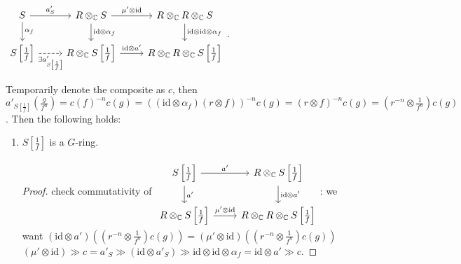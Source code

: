 \documentclass{article}
\theoremstyle{definition}
\newcommand{\tensorC}[2]{#1\otimes_\mathbb C #2}
\newcommand{\tensor}[2]{#1\otimes#2}
\newcommand{\id}{\mathrm{id}}
\begin{document}
$\begin{tikzcd}
  S \arrow[r, "a'_S"]\arrow[d, "\alpha_f"]& \tensorC R S\arrow[d, "\tensor\id{\alpha_f}"] \arrow[r, "\tensor{\mu'}{\id}"]& \tensorC{\tensorC R R} S\arrow[d, "\tensor{\tensor\id\id}{\alpha_f}"]\\
  {S\left[\frac1f\right]}\arrow[r, dashed, "\exists a'_{S\left[\frac1f\right]}"', description] & \tensorC R{S\left[\frac1f\right]} \arrow[r, "\tensor{\id}{a'}"]& \tensorC{\tensorC R R}{S\left[\frac1f\right]}
\end{tikzcd}
$.

Temporarily denote the composite as $c$, then $a'_{S\left[\frac1f\right]}(\frac g{f^n})=c(f)^{-n}c(g)=((\tensor\id{\alpha_f})(\tensor r f))^{-n}c(g)=
\left(\tensor rf\right)^{-n}c(g)=\left(\tensor{r^{-n}}{\frac1{f^n}}\right)c(g)$.
Then the following holds:
\begin{enumerate}
\item $S\left[\frac1f\right]$ is a $G$-ring.
  \begin{proof}
    check commutativity of
$
      \begin{tikzcd}
        {S\left[\frac1f\right]}\arrow[r, "a'"]\arrow[d, "a'"] & \tensorC R {S\left[\frac1f\right]} \arrow[d, "\tensor\id{a'}"]\\
        {\tensorC R{S\left[\frac1f\right]}}\arrow[r, "\tensor{\mu'}\id"] & \tensorC{\tensorC R R}{S\left[\frac1f\right]}
      \end{tikzcd}
      $: we want $(\tensor\id{a'})\left(\left(\tensor{r^{-n}}{\frac1{f^n}}\right)c(g)\right)=(\tensor{\mu'}\id)\left(\left(\tensor{r^{-n}}{\frac1{f^n}}\right)c(g)\right)$ $(\tensor{\mu'}{\id})\gg c=a'_S\gg (\tensor\id{a'_S}) \gg \tensor{\tensor\id\id}{\alpha_f}=\tensor\id{a'}\gg c$.
  \end{proof}
\end{enumerate}
\end{document}
